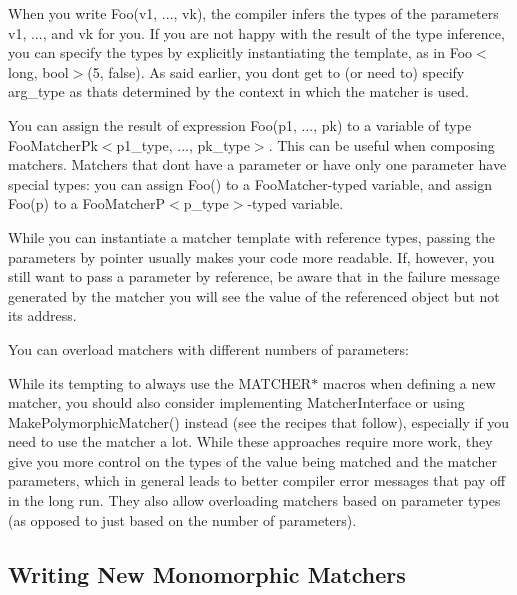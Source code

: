 When you write {\ttfamily Foo(v1, ..., vk)}, the compiler infers the types of the parameters {\ttfamily v1}, ..., and {\ttfamily vk} for you. If you are not happy with the result of the type inference, you can specify the types by explicitly instantiating the template, as in {\ttfamily Foo$<$long, bool$>$(5, false)}. As said earlier, you don\textquotesingle{}t get to (or need to) specify {\ttfamily arg\+\_\+type} as that\textquotesingle{}s determined by the context in which the matcher is used.

You can assign the result of expression {\ttfamily Foo(p1, ..., pk)} to a variable of type {\ttfamily Foo\+Matcher\+Pk$<$p1\+\_\+type, ..., pk\+\_\+type$>$}. This can be useful when composing matchers. Matchers that don\textquotesingle{}t have a parameter or have only one parameter have special types\+: you can assign {\ttfamily Foo()} to a {\ttfamily Foo\+Matcher}-\/typed variable, and assign {\ttfamily Foo(p)} to a {\ttfamily Foo\+MatcherP$<$p\+\_\+type$>$}-\/typed variable.

While you can instantiate a matcher template with reference types, passing the parameters by pointer usually makes your code more readable. If, however, you still want to pass a parameter by reference, be aware that in the failure message generated by the matcher you will see the value of the referenced object but not its address.

You can overload matchers with different numbers of parameters\+: 
\begin{DoxyCode}{0}
\end{DoxyCode}


While it\textquotesingle{}s tempting to always use the {\ttfamily M\+A\+T\+C\+H\+E\+R$\ast$} macros when defining a new matcher, you should also consider implementing {\ttfamily Matcher\+Interface} or using {\ttfamily Make\+Polymorphic\+Matcher()} instead (see the recipes that follow), especially if you need to use the matcher a lot. While these approaches require more work, they give you more control on the types of the value being matched and the matcher parameters, which in general leads to better compiler error messages that pay off in the long run. They also allow overloading matchers based on parameter types (as opposed to just based on the number of parameters).

\subsection*{Writing New Monomorphic Matchers}

